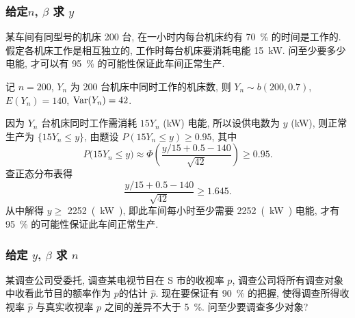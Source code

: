 \subsubsection{给定$n$, $\beta$ 求 $y$}

\begin{example}\label{exam:4.4.7}
    某车间有同型号的机床 200 台, 在一小时内每台机床约有 \SI{70}{\percent} 的时间是工作的.
    假定各机床工作是相互独立的, 工作时每台机床要消耗电能 \SI{15}{\kilo\watt}.
    问至少要多少电能, 才可以有 \SI{95}{\percent} 的可能性保证此车间正常生产.
\end{example}

\begin{solution}
    记 $ n = 200 $, $ Y_n $ 为 200 台机床中同时工作的机床数, 则 $ Y_n \sim b (200,0.7) $, $ E ( Y_n ) = 140 $, $\operatorname{Var}  (Y_n) = 42 $.

    因为 $ Y_n $ 台机床同时工作需消耗 $ 15Y_n $ (\si{\kilo\watt}) 电能, 所以设供电数为 $ y $ (\si{\kilo\watt}), 则正常生产为 $\{ 15 Y_n \leq y \}$, 由题设 $ P ( 15Y_n \leq y ) \geq 0.95 $, 其中
    \begin{equation*}
        P \bigl( 15Y_n \leq y \bigr) \approx \Phi \left( \frac{y/15 + 0.5 - 140}{\sqrt{42}} \right) \geq 0.95.
    \end{equation*}
    查正态分布表得
    \begin{equation*}
        \frac{y/15 + 0.5 - 140}{\sqrt{42}} \geq 1.645.
    \end{equation*}
    从中解得 $ y \geq $ \SI{2252}{(\kilo\watt)}, 即此车间每小时至少需要 \SI{2252}{(\kilo\watt)} 电能, 才有 \SI{95}{\percent} 的可能性保证此车间正常生产.
\end{solution}

\subsubsection{给定 $y$, $\beta$ 求 $n$}

\begin{example}\label{exam:4.4.8}
    某调查公司受委托, 调查某电视节目在 S 市的收视率 $ p $, 调查公司将所有调查对象中收看此节目的额率作为 $ p $的估计 $ \hat{p} $.
    现在要保证有 \SI{90}{\percent} 的把握, 使得调查所得收视率 $ \hat{p} $ 与真实收视率 $p$ 之间的差异不大于 \SI{5}{\percent}.
    问至少要调查多少对象?
\end{example}

